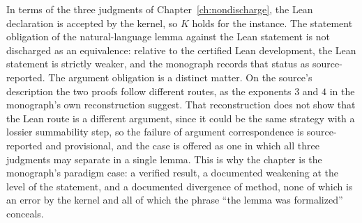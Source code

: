 In terms of the three judgments of Chapter~\ref{ch:nondischarge}, the Lean declaration is accepted by the kernel, so $K$ holds for the instance. The statement obligation of the natural-language lemma against the Lean statement is not discharged as an equivalence: relative to the certified Lean development, the Lean statement is strictly weaker, and the monograph records that status as source-reported. The argument obligation is a distinct matter. On the source's description the two proofs follow different routes, as the exponents $3$ and $4$ in the monograph's own reconstruction suggest. That reconstruction does not show that the Lean route is a different argument, since it could be the same strategy with a lossier summability step, so the failure of argument correspondence is source-reported and provisional, and the case is offered as one in which all three judgments may separate in a single lemma. This is why the chapter is the monograph's paradigm case: a verified result, a documented weakening at the level of the statement, and a documented divergence of method, none of which is an error by the kernel and all of which the phrase ``the lemma was formalized'' conceals.
